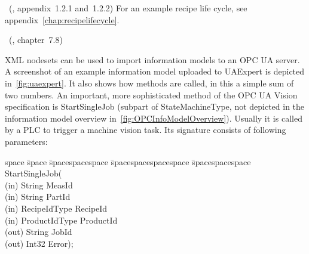 ~(\cite{OPC-Foundation2018OPC1.04}, appendix~1.2.1 and~1.2.2) For an example recipe life cycle, see appendix~\ref{chap:recipelifecycle}.

~(\cite{OPC-Foundation2018OPC1.04}, chapter~7.8)

XML nodesets can be used to import information models to an OPC UA server. A screenshot of an example information model uploaded to UAExpert is depicted in~\ref{fig:uaexpert}. It also shows how methods are called, in this a simple sum of two numbers. An important, more sophisticated method of the OPC UA Vision specification is StartSingleJob (subpart of StateMachineType, not depicted in the information model overview in~\ref{fig:OPCInfoModelOverview}). Usually it is called by a PLC to trigger a machine vision task. Its signature consists of following parameters:

\begin{minipage}{\linewidth}
\begin{tabbing}
    space \= space \= spacespacespace \= spacespacespacespace \= spacespacespace \kill
    \>  StartSingleJob(\\
    \>  \>  (in)	 \> 	String          \> MeasId\\
    \>  \>  (in)	 \> 	String          \> PartId\\
    \>  \>  (in)	 \> 	RecipeIdType    \> RecipeId\\
    \>  \>  (in)	 \> 	ProductIdType   \> ProductId\\
    \>  \>  (out)	 \> 	String          \> JobId\\
    \>  \>  (out)	 \> 	Int32           \> Error); 
\end{tabbing}
\end{minipage}

